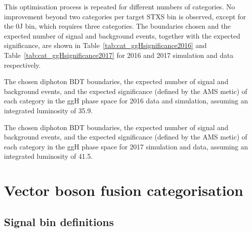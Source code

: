This optimisation process is repeated for different numbers of categories.
No improvement beyond two categories per target STXS bin is observed, 
except for the 0J bin, which requires three categories.
The boundaries chosen and the expected number of signal and background events, 
together with the expected significance, 
are shown in Table~\ref{tab:cat_ggHsignificance2016} and Table~\ref{tab:cat_ggHsignificance2017} 
for 2016 and 2017 simulation and data respectively.

\begin{table}
  \begin{centering}
    
    \caption{The chosen diphoton BDT boundaries, 
    the expected number of signal and background events, 
    and the expected significance (defined by the AMS metic) of each category in the ggH phase space 
    for 2016 data and simulation, assuming an integrated luminosity of \SI{35.9}{\fbinv}.}
    \label{tab:cat_ggHsignificance2016}
  \end{centering}
\end{table}

\begin{table}
  \begin{centering}
    
    \caption{The chosen diphoton BDT boundaries, 
    the expected number of signal and background events, 
    and the expected significance (defined by the AMS metic) of each category in the ggH phase space 
    for 2017 simulation and data, assuming an integrated luminosity of \SI{41.5}{\fbinv}.}
    \label{tab:cat_ggHsignificance2017}
  \end{centering}
\end{table}

\section{Vector boson fusion categorisation}
\subsection{Signal bin definitions}

